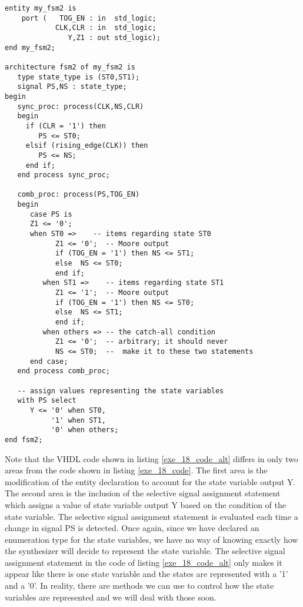 \begin{lstlisting}[label=exe_18_code_alt, caption=Solution to Example 18 that include state variable as output.]
entity my_fsm2 is 
    port (   TOG_EN : in  std_logic; 
            CLK,CLR : in  std_logic; 
               Y,Z1 : out std_logic); 
end my_fsm2;

architecture fsm2 of my_fsm2 is
   type state_type is (ST0,ST1); 
   signal PS,NS : state_type; 
begin
   sync_proc: process(CLK,NS,CLR)
   begin
     if (CLR = '1') then 
        PS <= ST0; 
     elsif (rising_edge(CLK)) then 
        PS <= NS; 
     end if; 
   end process sync_proc; 

   comb_proc: process(PS,TOG_EN)
   begin
      case PS is 
      Z1 <= '0';    
      when ST0 =>    -- items regarding state ST0
            Z1 <= '0';  -- Moore output
            if (TOG_EN = '1') then NS <= ST1; 
            else  NS <= ST0; 
            end if; 
         when ST1 =>    -- items regarding state ST1
            Z1 <= '1';  -- Moore output
            if (TOG_EN = '1') then NS <= ST0; 
            else  NS <= ST1; 
            end if; 
         when others => -- the catch-all condition
            Z1 <= '0';  -- arbitrary; it should never 
            NS <= ST0;  --  make it to these two statements
      end case; 
   end process comb_proc; 
 
   -- assign values representing the state variables
   with PS select
      Y <= '0' when ST0, 
           '1' when ST1, 
           '0' when others; 
end fsm2;
\end{lstlisting}

Note that the VHDL code shown in listing \ref{exe_18_code_alt} differs in only two areas from the code shown in listing \ref{exe_18_code}. The first area is the modification of the entity declaration to account for the state variable output Y. The second area is the inclusion of the selective signal assignment statement which assigns a value of state variable output Y based on the condition of the state variable. The selective signal assignment statement is evaluated each time a change in signal PS is detected. Once again, since we have declared an enumeration type for the state variables, we have no way of knowing exactly how the synthesizer will decide to represent the state variable. The selective signal assignment statement in the code of listing \ref{exe_18_code_alt} only makes it appear like there is one state variable and the states are represented with a '1' and a '0'. In reality, there are methods we can use to control how the state variables are represented and we will deal with those soon. 

